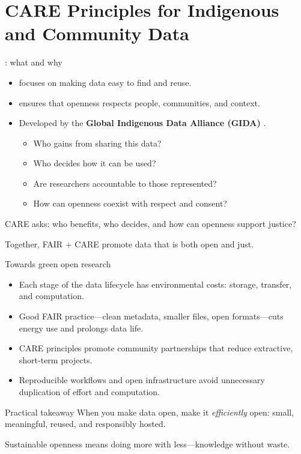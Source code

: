 \documentclass[xetex]{beamer}  %
\begin{document}
\section{CARE Principles for Indigenous and Community Data}

\begin{frame}{: what and why}
\begin{itemize}
  \item {} focuses on making data easy to find and reuse.  
  \item {} ensures that openness respects people, communities, and context.  
  \item Developed by the \textbf{Global Indigenous Data Alliance (GIDA)}
    \citep{CARE2020}.
\begin{itemize}
  \item {} Who gains from sharing this data?  
  \item {} Who decides how it can be used?  
  \item {} Are researchers accountable to those represented?  
  \item {} How can openness coexist with respect and consent?
\end{itemize}\end{itemize}
\medskip
CARE asks: who benefits, who decides, and how can openness support justice?

\medskip
Together, FAIR + CARE promote data that is both open and just.
\end{frame}

\begin{frame}{Towards green open research}
\begin{itemize}
  \item Each stage of the data lifecycle has environmental costs: storage, transfer, and computation.  
  \item Good FAIR practice—clean metadata, smaller files, open formats—cuts energy use and prolongs data life.  
  \item CARE principles promote community partnerships that reduce extractive, short-term projects.  
  \item Reproducible workflows and open infrastructure avoid unnecessary duplication of effort and computation.
\end{itemize}
\begin{exampleblock}{Practical takeaway}
When you make data open, make it \emph{efficiently} open: small, meaningful, reused, and responsibly hosted.
\end{exampleblock}
Sustainable openness means doing more with less—knowledge without waste.
\end{frame}
\end{document}

